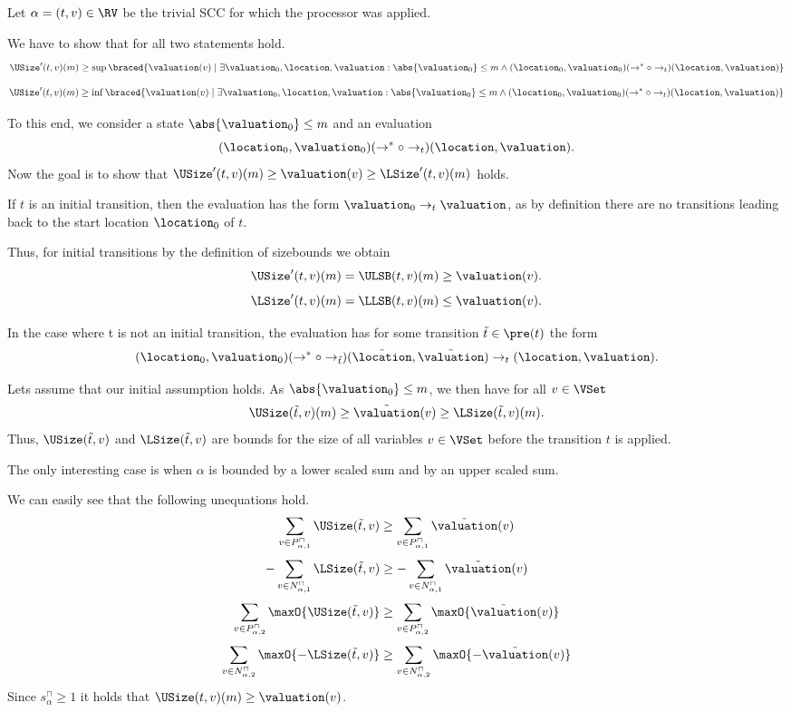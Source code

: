 Let $\alpha = (t, v) \in \RV$ be the trivial SCC for which the processor was applied.

We have to show that for all  two statements hold.
\[ \USize'(t, v)(m) \geq \sup \braced{ \valuation(v) \mid \exists \valuation_0, \location, \valuation: \abs{\valuation_0} \leq m \wedge (\location_0, \valuation_0) (\rightarrow^* \circ \rightarrow_t) (\location, \valuation)} \]
\[ \USize'(t, v)(m) \geq \inf \braced{ \valuation(v) \mid \exists \valuation_0, \location, \valuation: \abs{\valuation_0} \leq m \wedge (\location_0, \valuation_0) (\rightarrow^* \circ \rightarrow_t) (\location, \valuation)} \]

To this end, we consider a state $\abs{\valuation_0} \leq m$ and an evaluation
\[ (\location_0, \valuation_0) (\rightarrow^* \circ \rightarrow_t) (\location, \valuation). \]
Now the goal is to show that $\USize'(t, v)(m) \geq \valuation(v) \geq \LSize'(t, v)(m)$ holds.

If $t$ is an initial transition, then the evaluation has the form $\valuation_0 \rightarrow_t \valuation$, as by definition there are no transitions leading back to the start location $\location_0$ of $t$.

Thus, for initial transitions by the definition of sizebounds we obtain
\[ \USize'(t, v)(m) = \ULSB(t, v)(m) \geq \valuation(v). \]
\[ \LSize'(t, v)(m) = \LLSB(t, v)(m) \leq \valuation(v). \]

In the case where t is not an initial transition, the evaluation has for some transition $\tilde{t} \in \pre(t)$ the form
\[ (\location_0, \valuation_0) (\rightarrow^* \circ \rightarrow_{\tilde{t}}) (\tilde{\location}, \tilde{\valuation}) \rightarrow_t (\location, \valuation). \]

Lets assume that our initial assumption holds.
As $\abs{\valuation_0} \leq m$, we then have for all $v \in \VSet$
\[ \USize(\tilde{t}, v)(m) \geq \tilde{\valuation}(v) \geq \LSize(\tilde{t}, v)(m). \]
Thus, $\USize(\tilde{t}, v)$ and $\LSize(\tilde{t}, v)$ are bounds for the size of all variables $v \in \VSet$ before the transition $t$ is applied.

The only interesting case is when $\alpha$ is bounded by a lower scaled sum and by an upper scaled sum.

We can easily see that the following unequations hold.
\[ \sum_{v \in P_{\alpha,1}^\sqcap} \USize(\tilde{t}, v) \geq \sum_{v \in P_{\alpha,1}^\sqcap} \tilde{\valuation}(v) \]
\[ - \sum_{v \in N_{\alpha,1}^\sqcap} \LSize(\tilde{t}, v) \geq - \sum_{v \in N_{\alpha,1}^\sqcap} \tilde{\valuation}(v) \]
\[ \sum_{v \in P_{\alpha,2}^\sqcap} \maxO{\USize(\tilde{t}, v)} \geq \sum_{v \in P_{\alpha,2}^\sqcap} \maxO{\tilde{\valuation}(v)} \]
\[ \sum_{v \in N_{\alpha,2}^\sqcap} \maxO{-\LSize(\tilde{t}, v)} \geq \sum_{v \in N_{\alpha,2}^\sqcap} \maxO{-\tilde{\valuation}(v)} \]
Since $s^\sqcap_\alpha \geq 1$ it holds that $\USize(t, v)(m) \geq \valuation(v)$.

